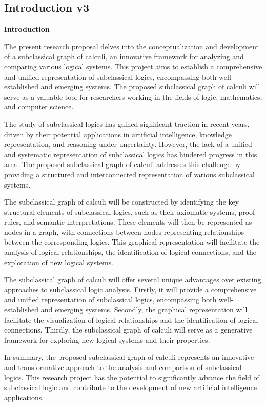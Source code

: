 \hypertarget{introduction-v3}{%
\subsection{Introduction v3}\label{introduction-v3}}

\textbf{Introduction}

The present research proposal delves into the conceptualization and
development of a subclassical graph of calculi, an innovative framework
for analyzing and comparing various logical systems. This project aims
to establish a comprehensive and unified representation of subclassical
logics, encompassing both well-established and emerging systems. The
proposed subclassical graph of calculi will serve as a valuable tool for
researchers working in the fields of logic, mathematics, and computer
science.

The study of subclassical logics has gained significant traction in
recent years, driven by their potential applications in artificial
intelligence, knowledge representation, and reasoning under uncertainty.
However, the lack of a unified and systematic representation of
subclassical logics has hindered progress in this area. The proposed
subclassical graph of calculi addresses this challenge by providing a
structured and interconnected representation of various subclassical
systems.

The subclassical graph of calculi will be constructed by identifying the
key structural elements of subclassical logics, such as their axiomatic
systems, proof rules, and semantic interpretations. These elements will
then be represented as nodes in a graph, with connections between nodes
representing relationships between the corresponding logics. This
graphical representation will facilitate the analysis of logical
relationships, the identification of logical connections, and the
exploration of new logical systems.

The subclassical graph of calculi will offer several unique advantages
over existing approaches to subclassical logic analysis. Firstly, it
will provide a comprehensive and unified representation of subclassical
logics, encompassing both well-established and emerging systems.
Secondly, the graphical representation will facilitate the visualization
of logical relationships and the identification of logical connections.
Thirdly, the subclassical graph of calculi will serve as a generative
framework for exploring new logical systems and their properties.

In summary, the proposed subclassical graph of calculi represents an
innovative and transformative approach to the analysis and comparison of
subclassical logics. This research project has the potential to
significantly advance the field of subclassical logic and contribute to
the development of new artificial intelligence applications.

